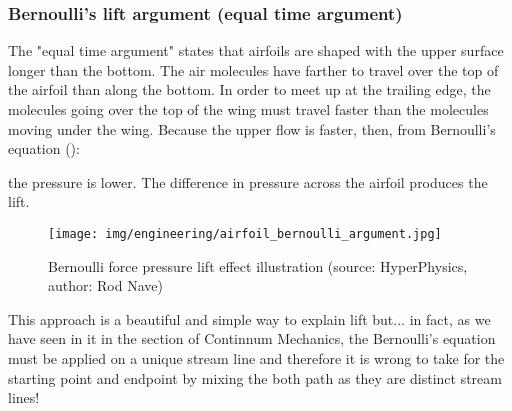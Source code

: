 	\subsubsection{Bernoulli's lift argument (equal time argument)}
	The "equal time argument" states that airfoils are shaped with the upper surface longer than the bottom. The air molecules have farther to travel over the top of the airfoil than along the bottom. In order to meet up at the trailing edge, the molecules going over the top of the wing must travel faster than the molecules moving under the wing. Because the upper flow is faster, then, from Bernoulli's equation ():
	
	the pressure is lower. The difference in pressure across the airfoil produces the lift.
	\begin{figure}[H]
		\centering
		\texttt{[image: img/engineering/airfoil\_bernoulli\_argument.jpg]}
		\caption{Bernoulli force pressure lift effect illustration (source: HyperPhysics, author: Rod Nave)}
	\end{figure}
	This approach is a beautiful and simple way to explain lift but... in fact, as we have seen in it in the section of Continnum Mechanics, the Bernoulli's equation must be applied on a unique stream line and therefore it is wrong to take for the starting point and endpoint by mixing the both path as they are distinct stream lines!
	
